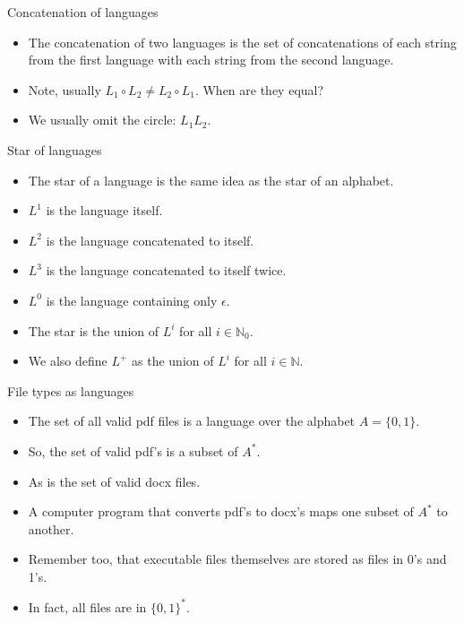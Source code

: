 \begin{frame}{Concatenation of languages}
  \begin{itemize}
    \setlength\itemsep{4mm}
    \item The concatenation of two languages is the set of concatenations of each string from the first language with each string from the second language.
    \item Note, usually $L_1 \circ L_2 \neq L_2 \circ L_1$. When are they equal?
    \item We usually omit the circle: $L_1 L_2$.
  \end{itemize}
\end{frame}


\begin{frame}{Star of languages}
  \begin{itemize}
    \item The star of a language is the same idea as the star of an alphabet.
    \item $L^1$ is the language itself.
    \item $L^2$ is the language concatenated to itself.
    \item $L^3$ is the language concatenated to itself twice.
    \item $L^0$ is the language containing only $\epsilon$.
    \item The star is the union of $L^i$ for all $i \in \mathbb{N}_0$.
    \item We also define $L^+$ as the union of $L^i$ for all $i \in \mathbb{N}$.
  \end{itemize}
\end{frame}


\begin{frame}{File types as languages}
  \begin{itemize}
    \setlength\itemsep{3mm}
    \item The set of all valid pdf files is a language over the alphabet $A =\{0,1\}$.
    \item So, the set of valid pdf's is a subset of $A^*$.
    \item As is the set of valid docx files.
    \item A computer program that converts pdf's to docx's maps one subset of $A^*$ to another.
    \item Remember too, that executable files themselves are stored as files in 0's and 1's.
    \item In fact, all files are in $\{0,1\}^*$.
  \end{itemize}
\end{frame}